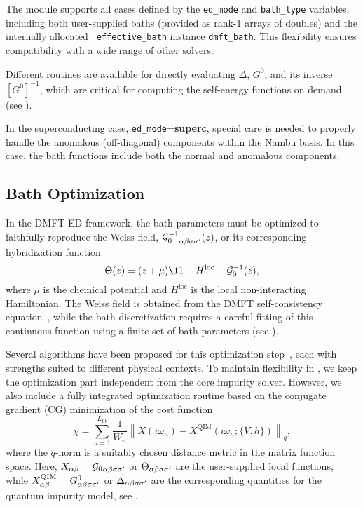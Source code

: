 \documentclass[edipack_sp.tex]{subfiles}
\begin{document}
The module supports all cases defined by the {\tt ed\_mode} and 
{\tt bath\_type} variables, including both user-supplied baths (provided 
as rank-1 arrays of doubles) and the internally allocated {\tt 
effective\_bath} instance {\tt dmft\_bath}. This flexibility ensures 
compatibility with a wide range of other solvers.

Different routines are available for directly evaluating $\Delta$, 
$G^0$, and its inverse $[G^0]^{-1}$, which are critical for computing 
the self-energy functions on demand (see ). 

In the superconducting case, {\tt ed\_mode}={\bf superc}, 
special care is needed to properly handle the anomalous (off-diagonal) 
components within the Nambu basis. In this case, the bath functions 
include both the normal and anomalous components. 



\subsection{Bath Optimization}\label{sSecFit}
In the DMFT-ED framework, the bath parameters must be optimized to 
faithfully reproduce the Weiss field, 
${{\cal G}^{-1}_{0}}_{\alpha\beta\sigma\sigma'}(z)$, or its corresponding hybridization 
function 
\begin{equation}
\Theta(z) = (z + \mu)\11 - H^\mathrm{loc} - \GG_0^{-1}(z),
\end{equation}
where $\mu$ is the chemical potential and $H^\mathrm{loc}$ is the 
local non-interacting Hamiltonian. The Weiss field is obtained from the DMFT 
self-consistency equation~\cite{Georges1996RMP}, while the bath 
discretization requires a careful fitting of this continuous function 
using a finite set of bath parameters (see ).

Several algorithms have been proposed for this optimization 
step~\cite{Garcia2004PRL,Taranto2012PRB,Mejuto_Bath_ASCI-DMFT}, each with strengths suited 
to different physical contexts. To maintain flexibility in \NAME, 
we keep the optimization part independent 
from the core impurity solver. However, we also include a fully 
integrated optimization routine based on the conjugate gradient (CG) 
minimization of the cost function
\begin{equation}
\chi = \sum_{n=1}^{L_\mathrm{fit}} 
\frac{1}{W_n} \left\|X(i\omega_n) - 
X^\mathrm{QIM}(i\omega_n; \{V, h\}) \right\|_q,
\label{eq:chiq}
\end{equation}
where the $q$-norm is a suitably chosen distance metric in the 
matrix function space. Here, $X_{\alpha\beta} = {{\cal G}_{0}}_{\alpha\beta\sigma\sigma'}$ or 
$\Theta_{\alpha\beta\sigma\sigma'}$ are the user-supplied local functions, while 
$X_{\alpha\beta}^\mathrm{QIM} = G^0_{\alpha\beta\sigma\sigma'}$ or 
$\Delta_{\alpha\beta\sigma\sigma'}$ are the corresponding quantities for the quantum 
impurity model, see .
\end{document}
